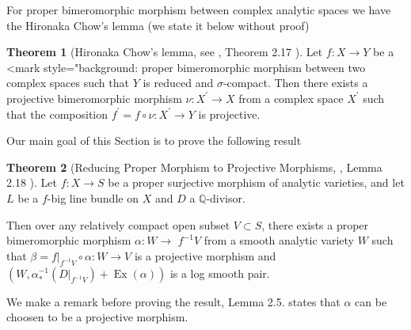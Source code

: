 \documentclass[11pt]{article}
\theoremstyle{definition}
\newtheorem{theorem}{Theorem}
\begin{document}
	For proper bimeromorphic morphism between complex analytic spaces we have the Hironaka Chow's lemma (we state it below without proof)
	\begin{theorem}[Hironaka Chow's lemma, see \cite{DasHacon}, Theorem 2.17 ]
		Let $f: X \rightarrow Y$ be a <mark style="background: proper bimeromorphic morphism between two complex spaces such that $Y$ is reduced and $\sigma$-compact. Then there exists a projective bimeromorphic morphism $\nu: X^{\prime} \rightarrow X$ from a complex space $X^{\prime}$ such that the composition $f^{\prime}=f \circ \nu: X^{\prime} \rightarrow Y$ is projective.
	\end{theorem}
	
	Our main goal of this Section is to prove the following result
	\begin{theorem}[Reducing Proper Morphism to Projective Morphisms, \cite{DasHacon}, Lemma 2.18 ]
		Let $f: X \rightarrow S$ be a proper surjective morphism of analytic varieties, and let $L$ be a $f$-big line bundle on $X$ and $D$ a $\mathbb{Q}$-divisor. 
		
		Then over any relatively compact open subset $V \subset S$, there exists a proper bimeromorphic morphism $\alpha: W \rightarrow$ $f^{-1} V$ from a smooth analytic variety $W$ such that $\beta=\left.f\right|_{f^{-1} V} \circ \alpha: W \rightarrow V$ is a projective morphism and $\left(W, \alpha_*^{-1}\left(\left.D\right|_{f^{-1} V}\right)+\operatorname{Ex}(\alpha)\right)$ is a log smooth pair.
	\end{theorem}
	We make a remark before proving the result, \cite{ClaudonHoring} Lemma 2.5. states that $\alpha$ can be choosen to be a projective morphism.
\end{document}
